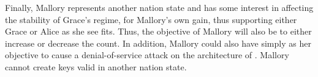 Finally, Mallory represents another nation state and has some interest in 
affecting the stability of Grace's regime, for Mallory's own gain, thus 
supporting either Grace or Alice as she see fits.
Thus, the objective of Mallory will also be to either increase or decrease the count.
In addition, Mallory could also have simply as her objective to cause a 
denial-of-service attack on the architecture of \PRIVO.
Mallory cannot create keys valid in another nation state.
